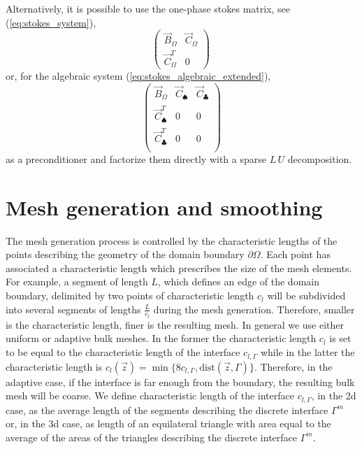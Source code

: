 Alternatively, it is possible to use the one-phase stokes matrix, see
(\ref{eq:stokes_system}),
\begin{equation}
\begin{pmatrix}
\vec B_\Omega & \vec C_\Omega \\
\vec C_\Omega^T & 0
\end{pmatrix}\,
\end{equation}
or, for the algebraic system (\ref{eq:stokes_algebraic_extended}),
\begin{equation}
\begin{pmatrix}
\vec B_\Omega & \vec C_\spadesuit & \vec C_\clubsuit \\
\vec C^T_\spadesuit & 0 & 0 \\
\vec C^T_\clubsuit & 0 & 0 \\
\end{pmatrix}
\end{equation}
as a preconditioner and factorize them directly with a sparse $L\,U$
decomposition.

\section{Mesh generation and smoothing}\label{sec:stokes_smoothing}
The mesh generation process is controlled by the characteristic lengths of the
points describing the geometry of the domain boundary $\partial\Omega$. Each
point has associated a characteristic length which prescribes the size of the
mesh elements. For example, a segment of length $L$, which defines an edge of
the domain boundary, delimited by two points of characteristic length $c_l$ will
be subdivided into several segments of lengths $\frac{L}{c_l}$ during the mesh
generation. Therefore, smaller is the characteristic length, finer is the
resulting mesh. In general we use either uniform or adaptive bulk meshes. In the
former the characteristic length $c_l$ is set to be equal to the characteristic
length of the interface $c_{l,\Gamma}$ while in the latter the characteristic
length is $c_l(\vec z)=\min\{8c_{l,\Gamma},\mbox{dist}(\vec z,\Gamma)\}$.
Therefore, in the adaptive case, if the interface is far enough from the
boundary, the resulting bulk mesh will be coarse. We define characteristic
length of the interface $c_{l,\Gamma}$, in the 2d case, as the average length
of the segments describing the discrete interface $\Gamma^m$ or, in the 3d case,
as length of an equilateral triangle with area equal to the average of the
areas of the triangles describing the discrete interface $\Gamma^m$.

